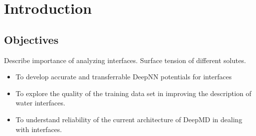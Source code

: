 \chapter{Introduction}

\section{Objectives}

Describe importance of analyzing interfaces. Surface tension of different
solutes.

\begin{itemize}
    \item To develop accurate and transferrable DeepNN potentials for
          interfaces
    \item To explore the quality of the training data set in improving the
          description of water interfaces.
    \item To understand reliability of the current architecture of DeepMD in
          dealing with interfaces.

\end{itemize}